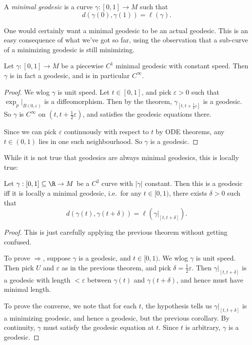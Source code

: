 \documentclass[a4paper]{article}
\begin{document}
\begin{defi}
  A \emph{minimal geodesic} is a curve $\gamma: [0, 1] \to M$ such that
  \[
    d(\gamma(0), \gamma(1)) = \ell(\gamma).
  \]
\end{defi}
One would certainly want a minimal geodesic to be an actual geodesic. This is an easy consequence of what we've got so far, using the observation that a sub-curve of a minimizing geodesic is still minimizing.

\begin{cor}
  Let $\gamma: [0, 1] \to M$ be a piecewise $C^1$ minimal geodesic with constant speed. Then $\gamma$ is in fact a geodesic, and is in particular $C^\infty$.
\end{cor}

\begin{proof}
  We wlog $\gamma$ is unit speed. Let $t \in [0, 1]$, and pick $\varepsilon > 0$ such that $\exp_p|_{B(0, \varepsilon)}$ is a diffeomorphism. Then by the theorem, $\gamma_{[t, t + \frac{1}{2}\varepsilon]}$ is a geodesic. So $\gamma$ is $C^\infty$ on $(t, t + \frac{1}{2}\varepsilon)$, and satisfies the geodesic equations there.

  Since we can pick $\varepsilon$ continuously with respect to $t$ by ODE theorems, any $t \in (0, 1)$ lies in one such neighbourhood. So $\gamma$ is a geodesic.
\end{proof}

While it is not true that geodesics are always minimal geodesics, this is locally true:
\begin{cor}
  Let $\gamma: [0, 1] \subseteq \R \to M$ be a $C^2$ curve with $|\dot{\gamma}|$ constant. Then this is a geodesic iff it is locally a minimal geodesic, i.e.\ for any $t \in [0, 1)$, there exists $\delta > 0$ such that
  \[
    d(\gamma(t), \gamma(t + \delta)) = \ell(\gamma|_{[t, t + \delta]}).
  \]
\end{cor}

\begin{proof}
  This is just carefully applying the previous theorem without getting confused.

  To prove $\Rightarrow$, suppose $\gamma$ is a geodesic, and $t \in [0, 1)$. We wlog $\gamma$ is unit speed. Then pick $U$ and $\varepsilon$ as in the previous theorem, and pick $\delta = \frac{1}{2}\varepsilon$. Then $\gamma|_{[t, t + \delta]}$ is a geodesic with length $ < \varepsilon$ between $\gamma(t)$ and $\gamma(t + \delta)$, and hence must have minimal length.

  To prove the converse, we note that for each $t$, the hypothesis tells us $\gamma|_{[t, t + \delta]}$ is a minimizing geodesic, and hence a geodesic, but the previous corollary. By continuity, $\gamma$ must satisfy the geodesic equation at $t$. Since $t$ is arbitrary, $\gamma$ is a geodesic.
\end{proof}
\end{document}
